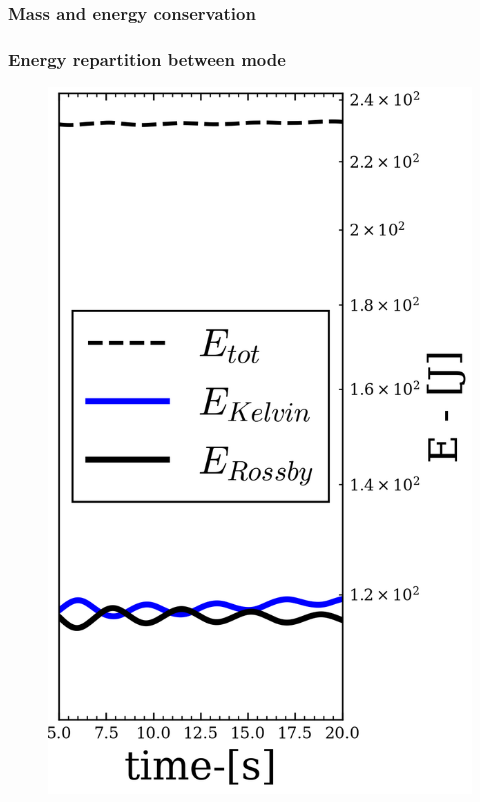\documentclass[numbering=fraction]{beamer}
\begin{document}
\subsubsection{Mass and energy conservation}
\begin{frame}
    \frametitle{Energy repartition between mode}
    \begin{minipage}{.4\linewidth}
        \begin{figure}[H]
            \centering
            \includegraphics[width=1\linewidth]{./figure/energy_repartition.png}
        \end{figure}
    \end{minipage}

\end{frame}
\end{document}
